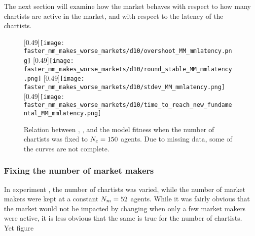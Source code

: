 The next section will examine how the market behaves with respect to how many chartists are active in the market, and with respect to the latency of the chartists.

\begin{figure}
	\centering
	\subcaptionbox{\label{fig:faster_mm_makes_worse_markets/d10/overshoot_MM_mmlatency}}
	[0.49\linewidth]{\texttt{[image: faster\_mm\_makes\_worse\_markets/d10/overshoot\_MM\_mmlatency.png]}}
	\subcaptionbox{\label{fig:faster_mm_makes_worse_markets/d10/round_stable_MM_mmlatency}}
	[0.49\linewidth]{\texttt{[image: faster\_mm\_makes\_worse\_markets/d10/round\_stable\_MM\_mmlatency.png]}}
	\vspace{0.5cm}
	\subcaptionbox{\label{fig:faster_mm_makes_worse_markets/d10/stdev_MM_mmlatency}}
	[0.49\linewidth]{\texttt{[image: faster\_mm\_makes\_worse\_markets/d10/stdev\_MM\_mmlatency.png]}}
	\subcaptionbox{\label{fig:faster_mm_makes_worse_markets/d10/time_to_reach_new_fundamental_MM_mmlatency}}
	[0.49\linewidth]{\texttt{[image: faster\_mm\_makes\_worse\_markets/d10/time\_to\_reach\_new\_fundamental\_MM\_mmlatency.png]}}
	\caption{Relation between \ssmmnAgents, \ssmmlatencymu, and the model fitness when the number of chartists was fixed to $N_{c} = 150$ agents. Due to missing data, some of the curves are not complete.}
	\label{fig:faster_mm_makes_worse_markets/d10/MM_mmlatency}
\end{figure}




\subsubsection{Fixing the number of market makers}
In experiment \deleven, the number of chartists was varied, while the number of market makers were kept at a constant $N_{m} = 52$ agents. While it was fairly obvious that the market would not be impacted by changing \ssmmlatencymu when only a few market makers were active, it is less obvious that the same is true for the number of chartists. Yet figure 

